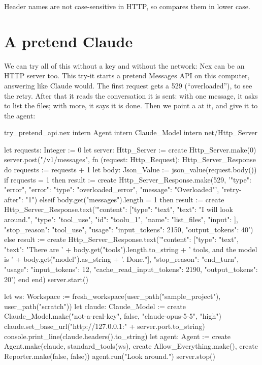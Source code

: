Header names are not case-sensitive in HTTP, so  compares
them in lower case.

\section{A pretend Claude}

We can try all of this without a key and without the network: Nex can be
an HTTP server too. This try-it starts a pretend Messages API on this
computer, answering like Claude would. The first request gets a 529
(``overloaded''), to see the retry. After that it reads the conversation it
is sent: with one message, it asks to list the files; with more, it says
it is done. Then we point a  at it, and give it to the
agent:

\begin{tryit}{try_pretend_api.nex}
intern Agent
intern Claude_Model
intern net/Http_Server

let requests: Integer := 0
let server: Http_Server := create Http_Server.make(0)
server.post("/v1/messages", fn (request: Http_Request): Http_Server_Response do
  requests := requests + 1
  let body: Json_Value := json_value(request.body())
  if requests = 1 then
    result := create Http_Server_Response.make(529,
      '{"type": "error", "error": {"type": "overloaded_error", "message": "Overloaded"}}',
      {"retry-after": "1"})
  elseif body.get("messages").length = 1 then
    result := create Http_Server_Response.text('{"content": [{"type": "text", "text": "I will look around."}, {"type": "tool_use", "id": "toolu_1", "name": "list_files", "input": {}}], "stop_reason": "tool_use", "usage": {"input_tokens": 2150, "output_tokens": 40}}')
  else
    result := create Http_Server_Response.text('{"content": [{"type": "text", "text": "There are '
      + body.get("tools").length.to_string + ' tools, and the model is '
      + body.get("model").as_string + '. Done."}], "stop_reason": "end_turn", "usage": {"input_tokens": 12, "cache_read_input_tokens": 2190, "output_tokens": 20}}')
  end
end)
server.start()

let ws: Workspace := fresh_workspace(user_path("sample_project"), user_path("scratch"))
let claude: Claude_Model := create Claude_Model.make("not-a-real-key", false, "claude-opus-5-5", "high")
claude.set_base_url("http://127.0.0.1:" + server.port.to_string)
console.print_line(claude.headers().to_string)
let agent: Agent := create Agent.make(claude, standard_tools(ws), create Allow_Everything.make(),
  create Reporter.make(false, false))
agent.run("Look around.")
server.stop()
\end{tryit}


